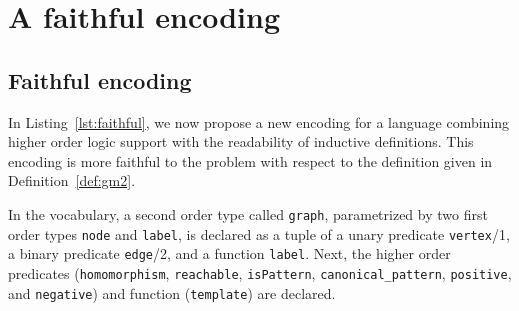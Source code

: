 \section{A faithful encoding}\label{sec:extension}


\subsection{Faithful encoding}
In Listing~\ref{lst:faithful}, we now propose a new encoding for a language combining higher order logic support with the readability of inductive definitions.
This encoding is more faithful to the problem with respect to the definition given in Definition~\ref{def:gm2}.

In the vocabulary, a second order type called \lstinline{graph}, parametrized by two first order types \lstinline{node} and {\lstset{breakatwhitespace} \lstinline{label},} is declared as a tuple of a unary predicate \lstinline{vertex}/1, a binary predicate \lstinline{edge}/2, and a function \lstinline|label|.
Next, the higher order predicates (\lstinline|homomorphism|, \lstinline|reachable|, \lstinline|isPattern|, \lstinline|canonical_pattern|, \lstinline|positive|, and \lstinline|negative|) and function (\lstinline|template|) are declared.

